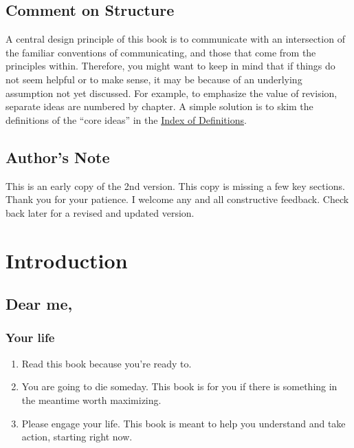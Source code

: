 \documentclass[
]{book}
\providecommand{\tightlist}{%
  \setlength{\itemsep}{0pt}\setlength{\parskip}{0pt}}
\begin{document}
\hypertarget{comment-on-structure}{%
\section{Comment on Structure}\label{comment-on-structure}}

A central design principle of this book is to communicate with an intersection of the familiar conventions of communicating, and those that come from the principles within. Therefore, you might want to keep in mind that if things do not seem helpful or to make sense, it may be because of an underlying assumption not yet discussed. For example, to emphasize the value of revision, separate ideas are numbered by chapter. A simple solution is to skim the definitions of the ``core ideas'' in the \protect\hyperlink{index-of-definitions}{Index of Definitions}.

\hypertarget{authors-note}{%
\section{Author's Note}\label{authors-note}}

This is an early copy of the 2nd version. This copy is missing a few key sections. Thank you for your patience. I welcome any and all constructive feedback. Check back later for a revised and updated version.

\hypertarget{introduction}{%
\chapter{Introduction}\label{introduction}}

\hypertarget{dear-me}{%
\section{Dear me,}\label{dear-me}}

\hypertarget{your-life}{%
\subsection{Your life}\label{your-life}}

\begin{enumerate}
\def\labelenumi{\arabic{enumi}.}
\tightlist
\item
  Read this book because you're ready to.
\item
  You are going to die someday. This book is for you if there is something in the
  meantime worth maximizing.
\item
  Please engage your life.
  This book is meant to help you understand and take action, starting right now.
\end{enumerate}
\end{document}
